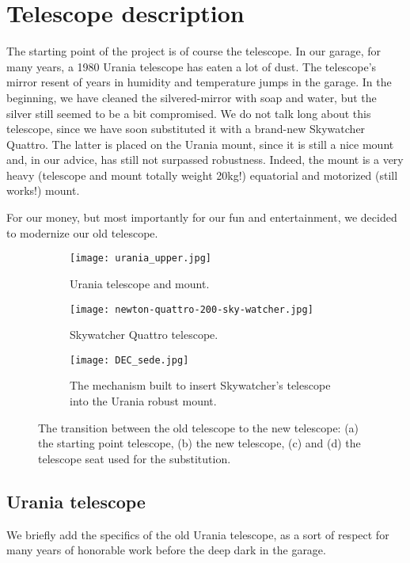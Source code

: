 \section{Telescope description}
\label{sec:telescope-description}
The starting point of the project is of course the telescope.
In our garage, for many years, a 1980 Urania telescope has eaten a lot of dust.
The telescope's mirror resent of years in humidity and temperature jumps in the garage.
In the beginning, we have cleaned the silvered-mirror with soap and water, but the silver still seemed to be a bit compromised.
We do not talk long about this telescope, since we have soon substituted it with a brand-new Skywatcher Quattro.
The latter is placed on the Urania mount, since it is still a nice mount and, in our advice, has still not surpassed robustness.
Indeed, the mount is a very heavy (telescope and mount totally weight 20kg!) equatorial and motorized (still works!) mount.

For our money, but most importantly for our fun and entertainment, we decided to modernize our old telescope.

\begin{figure*}
    \begin{subfigure}[t!]{0.33\textwidth}
        \centering
        \texttt{[image: urania\_upper.jpg]}
        \caption{Urania telescope and mount.}
        \label{fig:urania_telescope_mount}
    \end{subfigure}
    \begin{subfigure}[t!]{0.33\textwidth}
        \centering
        \texttt{[image: newton-quattro-200-sky-watcher.jpg]}
        \caption{Skywatcher Quattro telescope.}
        \label{fig:skywatcher_telescope_mount}
    \end{subfigure}
    \begin{subfigure}[t!]{0.33\textwidth}
        \centering
        \texttt{[image: DEC\_sede.jpg]}
        \caption{The mechanism built to insert Skywatcher's telescope into the Urania robust mount.}
        \label{fig:piastra_DEC}
    \end{subfigure}
    \caption{The transition between the old telescope to the new telescope: (a) the starting point telescope, (b) the new telescope, (c) and (d) the telescope seat used for the substitution.}
    \label{fig:telescope-subst}
\end{figure*}

\subsection{Urania telescope}
We briefly add the specifics of the old Urania telescope, as a sort of respect for many years of honorable work before the deep dark in the garage.


